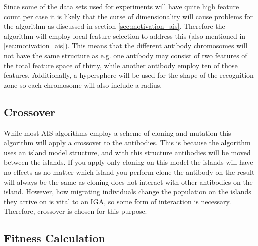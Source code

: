 Since some of the data sets used for experiments will have quite high feature count per case it is likely that the curse of dimensionality will cause problems for the algorithm as discussed in section \ref{sec:motivation_ais}. Therefore the algorithm will employ local feature selection to address this (also mentioned in \ref{sec:motivation_ais}). This means that the different antibody chromosomes will not have the same structure as e.g. one antibody may consist of two features of the total feature space of thirty, while another antibody employ ten of those features. Additionally, a hypersphere will be used for the shape of the recognition zone so each chromosome will also include a radius. 

\subsection{Crossover}
While most AIS algorithms employ a scheme of cloning and mutation this algorithm will apply a crossover to the antibodies. This is because the algorithm uses an island model structure, and with this structure antibodies will be moved between the islands. If you apply only cloning on this model the islands will have no effects as no matter which island you perform clone the antibody on the result will always be the same as cloning does not interact with other antibodies on the island. However, how migrating individuals change the population on the islands they arrive on is vital to an IGA, so some form of interaction is necessary. Therefore, crossover is chosen for this purpose. 

\subsection{Fitness Calculation}

